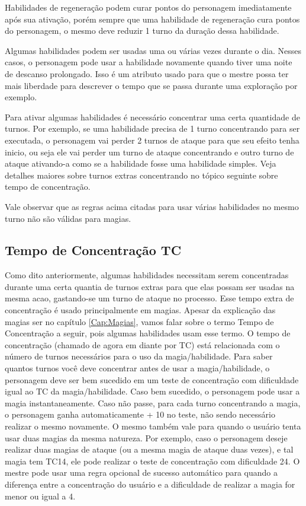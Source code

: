 Habilidades de regeneração podem curar pontos do personagem imediatamente após sua ativação, porém sempre que uma habilidade de regeneração cura pontos do personagem, o mesmo deve reduzir 1 turno da duração dessa habilidade.

Algumas habilidades podem ser usadas uma ou várias vezes durante o dia. Nesses casos, o personagem pode usar a habilidade novamente quando tiver uma noite de descanso prolongado. Isso é um atributo usado para que o mestre possa ter mais liberdade para descrever o tempo que se passa durante uma exploração por exemplo.

Para ativar algumas habilidades é necessário concentrar uma certa quantidade de turnos. Por exemplo, se uma habilidade precisa de 1 turno concentrando para ser executada, o personagem vai perder 2 turnos de ataque para que seu efeito tenha inicio, ou seja ele vai perder um turno de ataque concentrando e outro turno de ataque ativando-a como se a habilidade fosse uma habilidade simples. Veja detalhes maiores sobre turnos extras concentrando no tópico seguinte sobre tempo de concentração.


Vale observar que as regras acima citadas para usar várias habilidades no mesmo turno não são válidas para magias.

\subsection{Tempo de Concentração TC}

Como dito anteriormente, algumas habilidades necessitam serem concentradas durante uma certa quantia de turnos extras para que elas possam ser usadas na mesma acao, gastando-se um turno de ataque no processo. Esse tempo extra de concentração é usado principalmente em magias. Apesar da explicação das magias ser no capítulo \ref{Cap:Magias}, vamos falar sobre o termo Tempo de Concentração a seguir, pois algumas habilidades usam esse termo.
O tempo de concentração (chamado de agora em diante por TC) está relacionada com o número de turnos necessários para o uso da magia/habilidade. Para saber quantos turnos você deve concentrar antes de usar a magia/habilidade, o personagem deve ser bem sucedido em um teste de concentração com dificuldade igual ao TC da magia/habilidade. Caso bem sucedido, o personagem pode usar a magia instantaneamente. Caso não passe, para cada turno concentrando a magia, o personagem ganha automaticamente + 10 no teste, não sendo necessário realizar o mesmo novamente. O mesmo também vale para quando o usuário tenta usar duas magias da mesma natureza. Por exemplo, caso o personagem deseje realizar duas magias de ataque (ou a mesma magia de ataque duas vezes), e tal magia tem TC14, ele pode realizar o teste de concentração com dificuldade 24. O mestre pode usar uma regra opcional de sucesso automático para quando a diferença entre a concentração do usuário e a dificuldade de realizar a magia for menor ou igual a 4.

